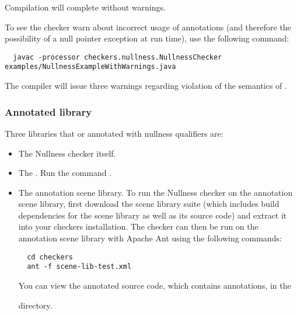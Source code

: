 \noindent
Compilation will complete without warnings.

To see the checker warn about incorrect usage of annotations (and therefore the
possibility of a null pointer exception at run time), use the following command:

\begin{Verbatim}
  javac -processor checkers.nullness.NullnessChecker examples/NullnessExampleWithWarnings.java
\end{Verbatim}

\noindent
The compiler will issue three warnings regarding violation of the semantics of
.


\subsubsection{Annotated library\label{nullness-annotated-library}}

Three libraries that or annotated with nullness qualifiers are:

\begin{itemize}
\item
The Nullness checker itself.

\item
The 
.
Run the command .

\item
The annotation scene library.
To run the Nullness checker on the annotation scene library,
first download the scene library suite (which includes build
dependencies for the scene library as well as its source code) and extract it
into your checkers installation. The checker can then be run on the annotation
scene library with Apache Ant using the following commands:

\begin{Verbatim}
  cd checkers
  ant -f scene-lib-test.xml
\end{Verbatim}


You can view the annotated source code, which contains  annotations, in
the
\begin{smaller}
\end{smaller}
directory.

\end{itemize}


